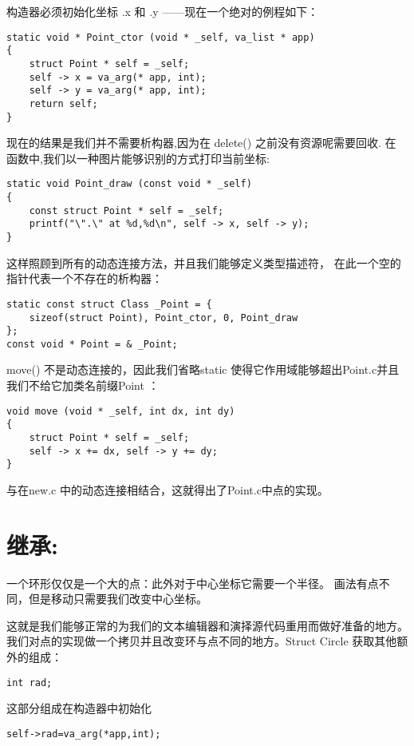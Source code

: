 构造器必须初始化坐标 .x 和 .y ——现在一个绝对的例程如下：
\begin{lstlisting}
static void * Point_ctor (void * _self, va_list * app)
{
    struct Point * self = _self;
    self -> x = va_arg(* app, int);
    self -> y = va_arg(* app, int);
    return self;
}
\end{lstlisting}

现在的结果是我们并不需要析构器,因为在 delete() 之前没有资源呢需要回收.
在 函数中,我们以一种图片能够识别的方式打印当前坐标:

\begin{lstlisting}
static void Point_draw (const void * _self)
{
    const struct Point * self = _self;
    printf("\".\" at %d,%d\n", self -> x, self -> y);
}
\end{lstlisting}

这样照顾到所有的动态连接方法，并且我们能够定义类型描述符，
在此一个空的指针代表一个不存在的析构器：
\begin{lstlisting}
static const struct Class _Point = {
    sizeof(struct Point), Point_ctor, 0, Point_draw
};
const void * Point = & _Point;
\end{lstlisting}

move() 不是动态连接的，因此我们省略static 
使得它作用域能够超出Point.c并且我们不给它加类名前缀Point ：
\begin{lstlisting}
void move (void * _self, int dx, int dy)
{
    struct Point * self = _self;
    self -> x += dx, self -> y += dy;
}
\end{lstlisting}

与在new.c 中的动态连接相结合，这就得出了Point.c中点的实现。

\section{继承:}
一个环形仅仅是一个大的点：此外对于中心坐标它需要一个半径。
画法有点不同，但是移动只需要我们改变中心坐标。

这就是我们能够正常的为我们的文本编辑器和演择源代码重用而做好准备的地方。
我们对点的实现做一个拷贝并且改变环与点不同的地方。Struct Circle 获取其他额外的组成：
\begin{lstlisting}
int rad;
\end{lstlisting}

这部分组成在构造器中初始化
\begin{lstlisting}
self->rad=va_arg(*app,int); 
\end{lstlisting}

